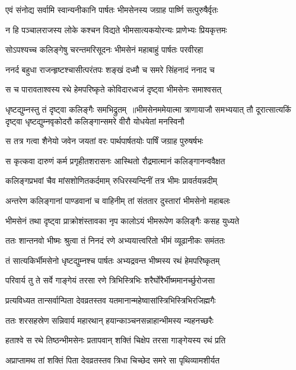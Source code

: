 \twolineshloka
{एवं संनोद्य सर्वामि स्वान्यनीकानि पार्षतः}
{भीमसेनस्य जग्राह पार्ष्णि सत्पुरुषैर्वृतः}


\twolineshloka
{न हि पञ्चालराजस्य लोके कश्चन विद्यते}
{भीमसात्यकयोरन्यः प्राणेभ्यः प्रियकृत्तमः}


\twolineshloka
{सोऽपश्यच्च कलिङ्गेषु चरन्तमरिसूदनः}
{भीमसेनं महाबाहुं पार्षतः परवीरहा}


\twolineshloka
{ननर्द बहुधा राजन्हृष्टश्चासीत्परंतपः}
{शङ्खं दध्मौ च समरे सिंहनादं ननाद च}


\threelineshloka
{स च पारावताश्वस्य रथे हेमपरिष्कृते}
{कोविदारध्वजं दृष्ट्वा भीमसेनः समाश्वसत्}
{}


धृष्टद्युम्नस्तु तं दृष्ट्वा कलिङ्गैः समभिद्रुतम् ॥भीमसेनममेयात्मा त्राणायाजौ समभ्ययात्
\threelineshloka
{तौ दूरात्सात्यकिं दृष्ट्वा धृष्टद्युम्नवृकोदरौ}
{कलिङ्गान्समरे वीरौ योधयेतां मनस्विनौ}
{}


\twolineshloka
{स तत्र गत्वा शैनेयो जवेन जयतां वरः}
{पार्थपार्षतयोः पार्षिं जग्राह पुरुषर्षभः}


\twolineshloka
{स कृत्कवा दारुणं कर्म प्रगृहीतशरासनः}
{आस्थितो रौद्रमात्मानं कलिङ्गानन्ववैक्षत}


\twolineshloka
{कलिङ्गप्रभवां चैव मांसशोणितकर्दमाम्}
{रुधिरस्यन्दिनीं तत्र भीमः प्रावर्तयन्नदीम्}


\twolineshloka
{अन्तरेण कलिङ्गानां पाण्डवानां च वाहिनीम्}
{तां संततार दुस्तारां भीमसेनो महाबलः}


\twolineshloka
{भीमसेनं तथा दृष्ट्वा प्राक्रोशंस्तावका नृप}
{कालोऽयं भीमरूपेण कलिङ्गैः कसह युध्यते}


\twolineshloka
{ततः शान्तनवो भीष्मः श्रुत्वा तं निनदं रणे}
{अभ्ययात्त्वरितो भीमं व्यूढानीकः समंततः}


\twolineshloka
{तं सात्यकिर्भीमसेनो धृष्टद्युम्नश्च पार्षतः}
{अभ्यद्रवन्त भीष्मस्य रथं हेमपरिष्कृतम्}


\twolineshloka
{परिवार्य तु ते सर्वे गाङ्गेयं तरसा रणे}
{त्रिभिस्त्रिभिः शरैर्घोरैर्भीष्ममानर्च्छुरोजसा}


\twolineshloka
{प्रत्यविध्यत तान्सर्वान्पिता देवव्रतस्तव}
{यतमानान्महेष्वासांस्त्रिभिस्त्रिभिरजिह्मगैः}


\twolineshloka
{ततः शरसहस्रेण सन्निवार्य महारथान्}
{हयान्काञ्चनसन्नाहान्भीमस्य न्यहनच्छरैः}


\twolineshloka
{हताश्वे स रथे तिष्ठन्भीमसेनः प्रतापवान्}
{शक्तिं चिक्षेप तरसा गाङ्गेयस्य रथं प्रति}


\twolineshloka
{अप्राप्तामथ तां शक्तिं पिता देवव्रतस्तव}
{त्रिधा चिच्छेद समरे सा पृथिव्यामशीर्यत}



